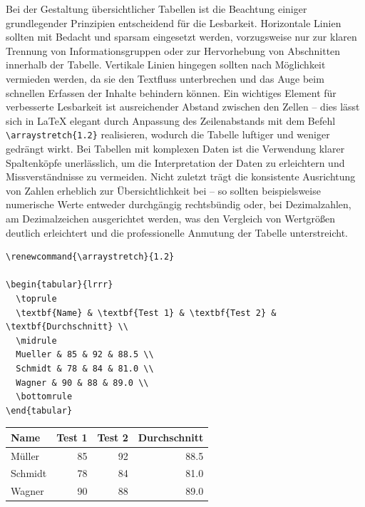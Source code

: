 \documentclass[12pt,a4paper]{article}
\begin{document}
Bei der Gestaltung übersichtlicher Tabellen ist die Beachtung einiger grundlegender Prinzipien entscheidend für die Lesbarkeit. Horizontale Linien sollten mit Bedacht und sparsam eingesetzt werden, vorzugsweise nur zur klaren Trennung von Informationsgruppen oder zur Hervorhebung von Abschnitten innerhalb der Tabelle. Vertikale Linien hingegen sollten nach Möglichkeit vermieden werden, da sie den Textfluss unterbrechen und das Auge beim schnellen Erfassen der Inhalte behindern können. Ein wichtiges Element für verbesserte Lesbarkeit ist ausreichender Abstand zwischen den Zellen – dies lässt sich in LaTeX elegant durch Anpassung des Zeilenabstands mit dem Befehl \texttt{\textbackslash arraystretch\{1.2\}} realisieren, wodurch die Tabelle luftiger und weniger gedrängt wirkt. Bei Tabellen mit komplexen Daten ist die Verwendung klarer Spaltenköpfe unerlässlich, um die Interpretation der Daten zu erleichtern und Missverständnisse zu vermeiden. Nicht zuletzt trägt die konsistente Ausrichtung von Zahlen erheblich zur Übersichtlichkeit bei – so sollten beispielsweise numerische Werte entweder durchgängig rechtsbündig oder, bei Dezimalzahlen, am Dezimalzeichen ausgerichtet werden, was den Vergleich von Wertgrößen deutlich erleichtert und die professionelle Anmutung der Tabelle unterstreicht.

\begin{lstlisting}[style=latex]
% Zeilenabstand in Tabellen vergroessern
\renewcommand{\arraystretch}{1.2}

\begin{tabular}{lrrr}
  \toprule
  \textbf{Name} & \textbf{Test 1} & \textbf{Test 2} & \textbf{Durchschnitt} \\
  \midrule
  Mueller & 85 & 92 & 88.5 \\
  Schmidt & 78 & 84 & 81.0 \\
  Wagner & 90 & 88 & 89.0 \\
  \bottomrule
\end{tabular}
\end{lstlisting}

\begin{ausgabe}
\begin{center}
\renewcommand{\arraystretch}{1.2}

\begin{tabular}{lrrr}
  \toprule
  \textbf{Name} & \textbf{Test 1} & \textbf{Test 2} & \textbf{Durchschnitt} \\
  \midrule
  Müller & 85 & 92 & 88.5 \\
  Schmidt & 78 & 84 & 81.0 \\
  Wagner & 90 & 88 & 89.0 \\
  \bottomrule
\end{tabular}
\end{center}
\end{ausgabe}
\end{document}
